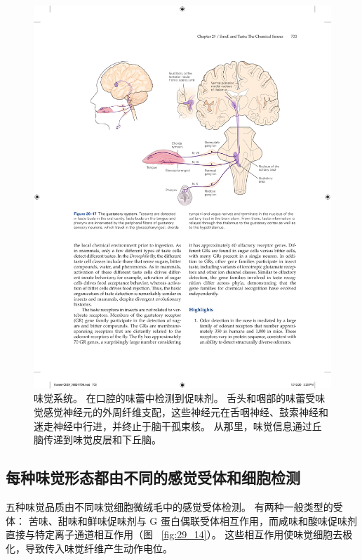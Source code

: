 \begin{figure}[htbp]
	\centering
	\includegraphics[width=0.75\linewidth]{chap29/fig_29_17}
	\caption{味觉系统。 在口腔的味蕾中检测到促味剂。 舌头和咽部的味蕾受味觉感觉神经元的外周纤维支配，这些神经元在舌咽神经、鼓索神经和迷走神经中行进，并终止于脑干孤束核。 从那里，味觉信息通过丘脑传递到味觉皮层和下丘脑。}
	\label{fig:29_17}
\end{figure}



\subsection{每种味觉形态都由不同的感觉受体和细胞检测}

五种味觉品质由不同味觉细胞微绒毛中的感觉受体检测。 
有两种一般类型的受体：
苦味、甜味和鲜味促味剂与 G 蛋白偶联受体相互作用，而咸味和酸味促味剂直接与特定离子通道相互作用（图 ~\ref{fig:29_14}）。 
这些相互作用使味觉细胞去极化，导致传入味觉纤维产生动作电位。


